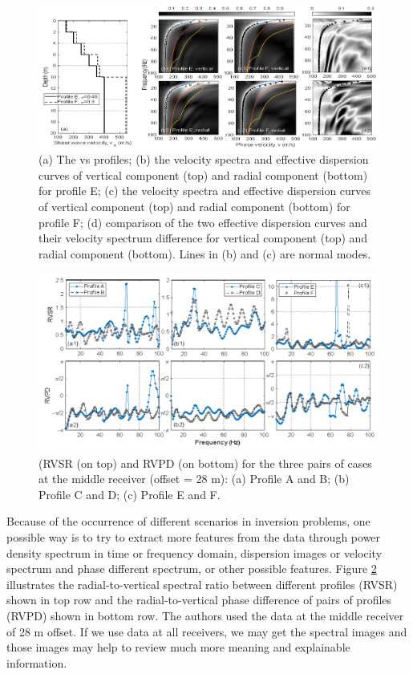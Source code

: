 \begin{figure}
    \centering
    \includegraphics[scale=0.45]{images/VsEF.png}
    \caption{(a) The vs profiles; (b) the velocity spectra and effective dispersion curves of vertical component (top) and radial component (bottom) for profile E; (c) the velocity spectra and effective dispersion curves of vertical component (top) and radial component (bottom) for profile F; (d) comparison of the two effective dispersion curves and their velocity spectrum difference for vertical component (top) and radial component (bottom). Lines in (b) and (c) are normal modes.}
    \label{fig:VsEF}
\end{figure}

\begin{figure}
    \centering
    \includegraphics[scale=0.45]{images/RVSR.png}
    \caption{(RVSR (on top) and RVPD (on bottom) for the three pairs of cases at the middle receiver (offset = 28 m): (a) Profile A and B; (b) Profile C and D; (c) Profile E and F.}
    \label{fig:RVSR}
\end{figure}

Because of the occurrence of different scenarios in inversion problems, one possible way is to try to extract more features from the data through power density spectrum in time or frequency domain, dispersion images or velocity spectrum and phase different spectrum, or other possible features. Figure \ref{fig:RVSR} illustrates the radial-to-vertical spectral ratio between different profiles (RVSR) shown in top row and the radial-to-vertical phase difference of pairs of profiles (RVPD) shown in bottom row. The authors used the data at the middle receiver of 28 m offset. If we use data at all receivers, we may get the spectral images and those images may help to review much more meaning and explainable information.  

